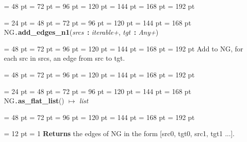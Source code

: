 {{{{\par \noindent  \leftskip = 48 pt  \leftmargini = 72 pt  \leftmarginii = 96 pt  \leftmarginiii = 120 pt  \leftmarginiv = 144 pt  \leftmarginv = 168 pt  \leftmarginvi = 192 pt {\par \noindent
\par}
\par}
\par}
\par}
{\par \noindent  \leftskip = 24 pt  \leftmargini = 48 pt  \leftmarginii = 72 pt  \leftmarginiii = 96 pt  \leftmarginiv = 120 pt  \leftmarginv = 144 pt  \leftmarginvi = 168 pt NG{\tt .\/}{\bf {\large {\bf add{\_}edges{\_}n1\/}}\/}({\em srcs\/}~{\bf :}  {\em iterable+\/}, {\em tgt\/}~{\bf :}  {\em Any+\/}){\par \noindent
{\par \noindent  \leftskip = 48 pt  \leftmargini = 72 pt  \leftmarginii = 96 pt  \leftmarginiii = 120 pt  \leftmarginiv = 144 pt  \leftmarginv = 168 pt  \leftmarginvi = 192 pt  Add to NG, for each src in srcs, an edge from src to tgt.\par}
{\par \noindent  \leftskip = 48 pt  \leftmargini = 72 pt  \leftmarginii = 96 pt  \leftmarginiii = 120 pt  \leftmarginiv = 144 pt  \leftmarginv = 168 pt  \leftmarginvi = 192 pt {\par \noindent
\par}
\par}
\par}
\par}
{\par \noindent  \leftskip = 24 pt  \leftmargini = 48 pt  \leftmarginii = 72 pt  \leftmarginiii = 96 pt  \leftmarginiv = 120 pt  \leftmarginv = 144 pt  \leftmarginvi = 168 pt NG{\tt .\/}{\bf {\large {\bf as{\_}flat{\_}list\/}}\/}() \(\mapsto \)  {\em list\/}{\par \noindent
{\par \noindent  \leftskip = 48 pt  \leftmargini = 72 pt  \leftmarginii = 96 pt  \leftmarginiii = 120 pt  \leftmarginiv = 144 pt  \leftmarginv = 168 pt  \leftmarginvi = 192 pt {\par \noindent
{\par \pagebreak[3.100000] \noindent \hangindent = 12 pt \hangafter = 1 
{\bf Returns \/} the edges of NG in the form {[}src0, tgt0, src1, tgt1 ...].
\par}
\par}
\par}
\par}
}}
